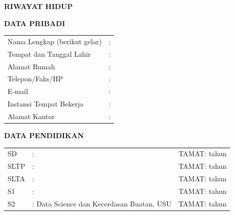 \thispagestyle{empty}
\begin{center}
{\bfseries RIWAYAT HIDUP\par}
\vspace{10mm}
\end{center}

\noindent\textbf{DATA PRIBADI}

\vspace{4mm}
\noindent
\begin{tabular}{@{}p{5.5cm}l@{}}
Nama Lengkap (berikut gelar) & : \\
Tempat dan Tanggal Lahir     & : \\
Alamat Rumah                 & : \\
Telepon/Faks/HP              & : \\
E-mail                       & : \\
Instansi Tempat Bekerja      & : \\
Alamat Kantor                & : \\
\end{tabular}

\vspace{10mm}
\noindent\textbf{DATA PENDIDIKAN}

\vspace{4mm}
\noindent
\begin{tabular}{@{}p{2cm}l l@{}}
SD   & : & TAMAT: tahun \\
SLTP & : & TAMAT: tahun \\
SLTA & : & TAMAT: tahun \\
S1   & : & TAMAT: tahun \\
S2   & : Data Science dan Kecerdasan Buatan, USU & TAMAT: tahun \\
\end{tabular}
\clearpage
